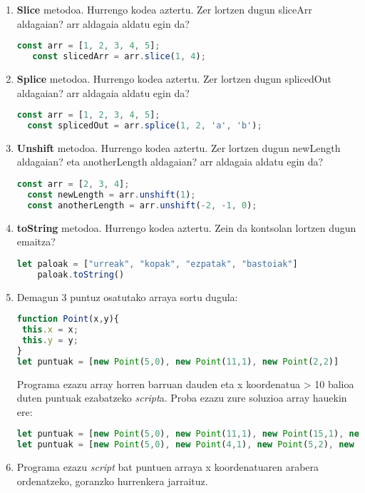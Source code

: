  \begin{enumerate}

   \item \textbf{Slice} metodoa. Hurrengo kodea aztertu. Zer lortzen dugun sliceArr aldagaian? arr aldagaia aldatu egin da?
   
   \begin{lstlisting}[language=JavaScript,numbers=none]
   const arr = [1, 2, 3, 4, 5];
   const slicedArr = arr.slice(1, 4);
   \end{lstlisting}

   \item \textbf{Splice} metodoa. Hurrengo kodea aztertu. Zer lortzen dugun splicedOut aldagaian? arr aldagaia aldatu egin da?
   
   \begin{lstlisting}[language=JavaScript,numbers=none]
   const arr = [1, 2, 3, 4, 5];
  const splicedOut = arr.splice(1, 2, 'a', 'b');
  \end{lstlisting}

  \item \textbf{Unshift} metodoa. Hurrengo kodea aztertu. Zer lortzen dugun newLength aldagaian? eta anotherLength aldagaian? arr aldagaia aldatu egin da?
   \begin{lstlisting}[language=JavaScript,numbers=none]
  const arr = [2, 3, 4];
  const newLength = arr.unshift(1); 
  const anotherLength = arr.unshift(-2, -1, 0);
  \end{lstlisting}

  \item \textbf{toString} metodoa. Hurrengo kodea aztertu. 
  Zein da kontsolan lortzen dugun emaitza?
   \begin{lstlisting}[language=JavaScript,numbers=none]
    let paloak = ["urreak", "kopak", "ezpatak", "bastoiak"]
    paloak.toString()
   \end{lstlisting}
  
     \item Demagun 3 puntuz osatutako arraya sortu dugula:
     \begin{lstlisting}[language=JavaScript]
function Point(x,y){
 this.x = x;
 this.y = y;
}
let puntuak = [new Point(5,0), new Point(11,1), new Point(2,2)]

\end{lstlisting}

Programa ezazu array horren barruan dauden eta x koordenatua > 10 balioa duten
puntuak ezabatzeko \textit{script}a. Proba ezazu zure soluzioa array hauekin ere:

\begin{lstlisting}[language=JavaScript]
let puntuak = [new Point(5,0), new Point(11,1), new Point(15,1), new Point(2,2)];
let puntuak = [new Point(5,0), new Point(4,1), new Point(5,2), new Point(6,0), new Point(11,1), new Point(15,2)];
\end{lstlisting}

\item Programa ezazu \textit{script} bat puntuen arraya x koordenatuaren arabera ordenatzeko, goranzko hurrenkera jarraituz.
\end{enumerate}
